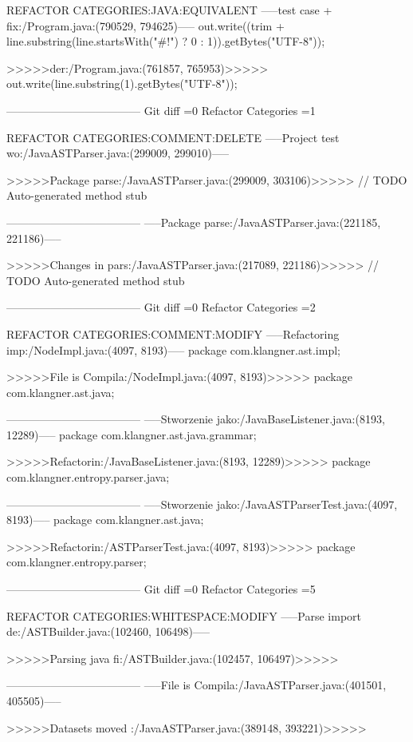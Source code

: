 {{{{{{{{{{{REFACTOR CATEGORIES:JAVA:EQUIVALENT
-----test case + fix:/Program.java:(790529, 794625)-----
			out.write((trim + line.substring(line.startsWith("#!") ? 0 : 1)).getBytes("UTF-8"));
	
>>>>>der:/Program.java:(761857, 765953)>>>>>
			out.write(line.substring(1).getBytes("UTF-8"));
	
------------------------------------
Git diff =0  Refactor Categories =1

REFACTOR CATEGORIES:COMMENT:DELETE
-----Project test wo:/JavaASTParser.java:(299009, 299010)-----
		
>>>>>Package parse:/JavaASTParser.java:(299009, 303106)>>>>>
		// TODO Auto-generated method stub
		
------------------------------------
-----Package parse:/JavaASTParser.java:(221185, 221186)-----
		
>>>>>Changes in pars:/JavaASTParser.java:(217089, 221186)>>>>>
		// TODO Auto-generated method stub
		
------------------------------------
Git diff =0  Refactor Categories =2

REFACTOR CATEGORIES:COMMENT:MODIFY
-----Refactoring imp:/NodeImpl.java:(4097, 8193)-----
package com.klangner.ast.impl;


>>>>>File is Compila:/NodeImpl.java:(4097, 8193)>>>>>
package com.klangner.ast.java;


------------------------------------
-----Stworzenie jako:/JavaBaseListener.java:(8193, 12289)-----
package com.klangner.ast.java.grammar;


>>>>>Refactorin:/JavaBaseListener.java:(8193, 12289)>>>>>
package com.klangner.entropy.parser.java;


------------------------------------
-----Stworzenie jako:/JavaASTParserTest.java:(4097, 8193)-----
package com.klangner.ast.java;


>>>>>Refactorin:/ASTParserTest.java:(4097, 8193)>>>>>
package com.klangner.entropy.parser;


------------------------------------
Git diff =0  Refactor Categories =5

REFACTOR CATEGORIES:WHITESPACE:MODIFY
-----Parse import de:/ASTBuilder.java:(102460, 106498)-----

		
>>>>>Parsing java fi:/ASTBuilder.java:(102457, 106497)>>>>>

	
------------------------------------
-----File is Compila:/JavaASTParser.java:(401501, 405505)-----

	
>>>>>Datasets moved :/JavaASTParser.java:(389148, 393221)>>>>>

}}}}}}}}}}}

